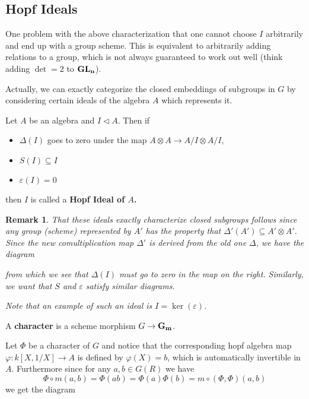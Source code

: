 \documentclass[12pt]{article}
\theoremstyle{nonumberbreak}
\theoremstyle{changebreak}
\theoremstyle{nonumberplain}
\theoremstyle{change}
\newtheorem{rmk}[thm]{Remark}
\newcommand{\Gm}{\ensuremath\mathbf{G_m}}
\newcommand*{\GL}[1]{\ensuremath\mathbf{GL_#1}}
\begin{document}
\subsection{Hopf Ideals}
One problem with the above characterization that one cannot choose $I$ arbitrarily and end
up with a group scheme. This is equivalent to arbitrarily adding relations to a group, which is
not always guaranteed to work out well (think adding $\det = 2$ to $\GL n$).

Actually, we can exactly categorize the closed embeddings of subgroups in $G$ by considering certain
ideals of the algebra $A$ which represents it. 
\begin{defn}
	Let $A$ be an algebra and $I\lhd A$. Then if 
	\begin{itemize}
		\item $\Delta(I)$ goes to zero under the map $A\otimes A\to A/I\otimes A/I$,
		\item $S(I)\subseteq I$
		\item $\varepsilon(I)=0$
	\end{itemize}
	then $I$ is called a \textbf{Hopf Ideal of $A$.}
\end{defn}

\begin{rmk}
	That these ideals exactly characterize closed subgroups follows since any group (scheme) represented
	by $A'$ has the property that $\Delta'(A')\subseteq A'\otimes A'$. Since the new comultiplication map
	$\Delta'$ is derived from the old one $\Delta$, we have the diagram
	\begin{figure}[h]
	\end{figure}
	
	\noindent from which we see that $\Delta(I)$ must go to zero in the map on the right.
	Similarly, we want that $S$ and $\varepsilon$ satisfy similar diagrams.

	Note that an example of such an ideal is $I=\ker(\varepsilon)$.
\end{rmk}

\begin{defn}
	A \textbf{character} is a scheme morphism $G\to \Gm$.
\end{defn}

Let $\Phi$ be a character of $G$ and notice that the corresponding hopf algebra map 
$\varphi:k[X,1/X]\to A$ is defined by $\varphi(X)=b$, which
is automatically invertible in $A$. Furthermore since for any $a,b\in G(R)$ we have
\[\Phi\circ m(a,b)=\Phi(ab)=\Phi(a)\Phi(b)=m\circ(\Phi,\Phi)(a,b)\]
we get the diagram
\begin{figure}[h]
\end{figure}
\end{document}
